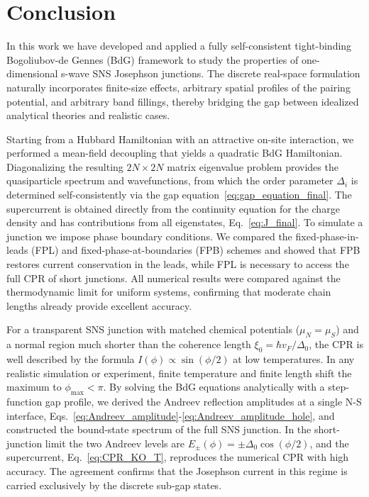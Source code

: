 \documentclass[11pt,a4paper,twoside,openany]{report}
\begin{document}
\chapter{Conclusion}

In this work we have developed and applied a fully self-consistent tight-binding Bogoliubov-de Gennes (BdG) framework to study the properties of one-dimensional s-wave SNS Josephson junctions. The discrete real-space formulation naturally incorporates finite-size effects, arbitrary spatial profiles of the pairing potential, and arbitrary band fillings, thereby bridging the gap between idealized analytical theories and realistic cases.

\medskip
\noindent 
Starting from a Hubbard Hamiltonian with an attractive on-site interaction, we performed a mean-field decoupling that yields a quadratic BdG Hamiltonian. Diagonalizing the resulting \(2N\times 2N\) matrix eigenvalue problem provides the quasiparticle spectrum and wavefunctions, from which the order parameter \(\Delta_i\) is determined self-consistently via the gap equation~\eqref{eq:gap_equation_final}. The supercurrent is obtained directly from the continuity equation for the charge density and has contributions from all eigenstates, Eq.~\eqref{eq:J_final}. To simulate a junction we impose phase boundary conditions. We compared the fixed-phase-in-leads (FPL) and fixed-phase-at-boundaries (FPB) schemes and showed that FPB restores current conservation in the leads, while FPL is necessary to access the full CPR of short junctions. All numerical results were compared against the thermodynamic limit for uniform systems, confirming that moderate chain lengths already provide excellent accuracy.

\medskip
\noindent 
For a transparent SNS junction with matched chemical potentials (\(\mu_N = \mu_S\)) and a normal region much shorter than the coherence length \(\xi_0 = \hbar v_F/\Delta_0\), the CPR is well described by the formula \(I(\phi) \propto \sin(\phi/2)\) at low temperatures. In any realistic simulation or experiment, finite temperature and finite length shift the maximum to $\phi_{\max}<\pi$. By solving the BdG equations analytically with a step-function gap profile, we derived the Andreev reflection amplitudes at a single N-S interface, Eqs.~\eqref{eq:Andreev_amplitude}-\eqref{eq:Andreev_amplitude_hole}, and constructed the bound-state spectrum of the full SNS junction.  In the short-junction limit the two Andreev levels are \(E_\pm(\phi) = \pm\Delta_0 \cos(\phi/2)\), and the supercurrent, Eq.~\eqref{eq:CPR_KO_T}, reproduces the numerical CPR with high accuracy. The agreement confirms that the Josephson current in this regime is carried exclusively by the discrete sub-gap states.
\end{document}
